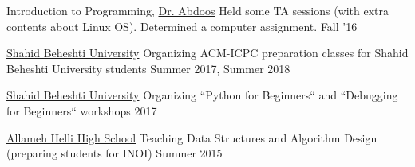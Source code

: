 \begin{cvtas}
  \cvta
    {Introduction to Programming, \href{http://facultymembers.sbu.ac.ir/abdoos/}{Dr. Abdoos}} %
    {Held some TA sessions (with extra contents about Linux OS). Determined a computer assignment.} %
    {Fall '16} %
    {} %


\end{cvtas}




\begin{cvtas}

  \cvta
    {\href{http://en.sbu.ac.ir}{Shahid Beheshti University}} %
    {Organizing ACM-ICPC preparation classes for Shahid Beheshti University students}
    {Summer 2017, Summer 2018} %
    {} %



  \cvta
    {\href{http://en.sbu.ac.ir/}{Shahid Beheshti University}} %
    {Organizing ``Python for Beginners`` and ``Debugging for Beginners`` workshops} %
    {2017} %
    {} %

  \cvta
    {\href{http://helli.ir}{Allameh Helli High School}} %
    {Teaching Data Structures and Algorithm Design (preparing students for INOI)} %
    {Summer 2015} %
    {} %

\end{cvtas}